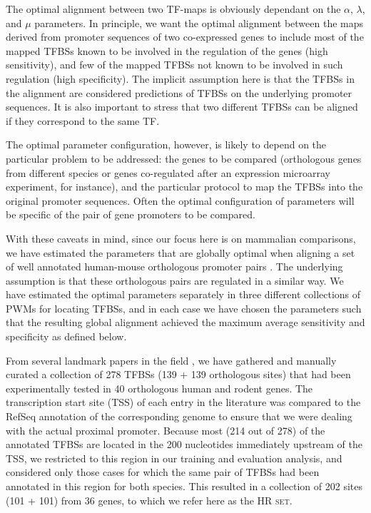 \label{sec:TF-map training}
  
The optimal alignment between two TF-maps is obviously
dependant on the $\alpha$, $\lambda$, and $\mu$ parameters. In
principle, we want the optimal alignment between the maps derived from
promoter sequences of two co-expressed genes to include most of the
mapped TFBSs known to be involved in the regulation of the genes (high
sensitivity), and few of the mapped TFBSs not known to be involved in such
regulation (high specificity). The implicit assumption here is that
the TFBSs in the alignment are considered predictions of TFBSs on the
underlying promoter sequences. It is also important to stress that two
different TFBSs can be aligned if they correspond to the same TF.

The optimal parameter configuration, however, is likely
to depend on the particular problem to be addressed: the genes to be
compared (orthologous genes from different species or genes
co-regulated after an expression microarray experiment, for instance),
and the particular protocol to map the TFBSs into the original promoter
sequences. Often the optimal configuration of parameters will be
specific of the pair of gene promoters to be compared. 

With these caveats in mind, since our focus here is on mammalian comparisons,
we have estimated the parameters that are globally optimal when aligning a set of well
annotated human-mouse orthologous promoter pairs \citep{blanco:2006b}. The underlying
assumption is that these orthologous pairs are regulated in a
similar way. We have estimated the optimal parameters separately 
in three different collections of PWMs for locating TFBSs,
and in each case we have chosen the parameters such that the resulting 
global alignment achieved the maximum average sensitivity and specificity as 
defined below.


From several landmark papers in the field
\citep{wasserman:1998a,krivan:2001a,blanchette:2002a,dermitzakis:2002a,lenhard:2003a}, 
we have gathered and manually curated a collection of 278 TFBSs (139 +
139 orthologous sites) that had been experimentally tested in 40
orthologous human and rodent genes. The transcription start site (TSS)
of each entry in the literature was compared to the RefSeq \citep{pruitt:2005a}
annotation of the corresponding genome to ensure that we were dealing with the
actual proximal promoter. Because most (214 out of 278) of
the annotated TFBSs are located in the 200 nucleotides immediately
upstream of the TSS, we restricted to this region in our training and
evaluation analysis, and considered only those cases for which the
same pair of TFBSs had been annotated in this region for both species. 
This resulted in a collection of 202 sites (101 + 101)
from 36 genes, to which we refer here as the \textsc{HR set}.

